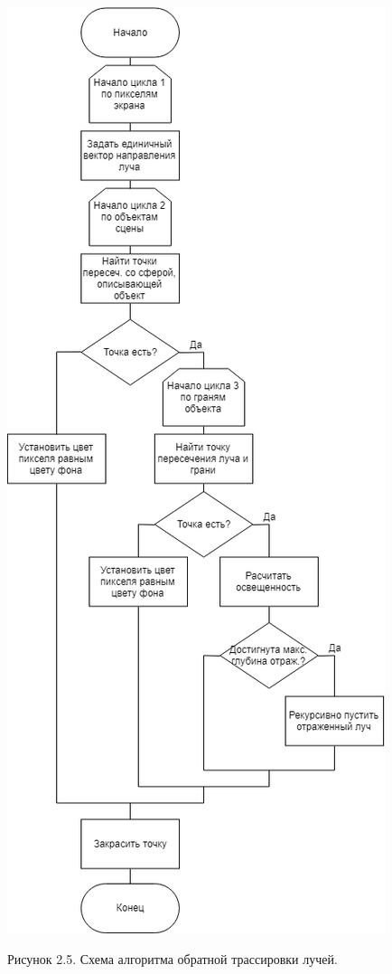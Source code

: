 \documentclass[12pt]{report}
\begin{document}
	\begin{center}
		\includegraphics[scale=0.5]{rtBS.png}
		
		Рисунок 2.5. Схема алгоритма обратной трассировки лучей.
	\end{center}
	\newpage
\end{document}
